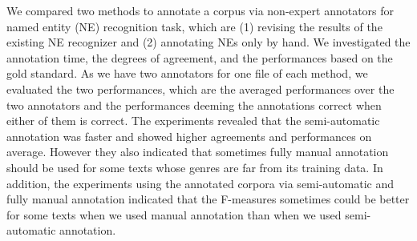 We compared two methods to annotate a corpus via non-expert annotators for named entity (NE) recognition task, which are (1) revising the results of the existing NE recognizer and (2) annotating NEs only by hand. We investigated the annotation time, the degrees of agreement, and the performances based on the gold standard. As we have two annotators for one file of each method, we evaluated the two performances, which are the averaged performances over the two annotators and the performances deeming the annotations correct when either of them is correct. The experiments revealed that the semi-automatic annotation was faster and showed higher agreements and performances on average. However they also indicated that sometimes fully manual annotation should be used for some texts whose genres are far from its training data. In addition, the experiments using the annotated corpora via semi-automatic and fully manual annotation indicated that the F-measures sometimes could be better for some texts when we used manual annotation than when we used semi-automatic annotation.
